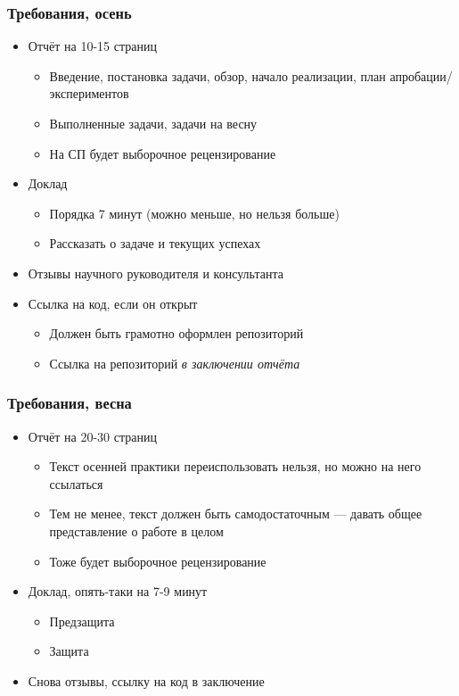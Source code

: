 \documentclass{../../slides-style}
\begin{document}
    \begin{frame}
        \frametitle{Требования, осень}
        \begin{itemize}
            \item Отчёт на 10-15 страниц
            \begin{itemize}
                \item Введение, постановка задачи, обзор, начало реализации, план апробации/экспериментов
                \item Выполненные задачи, задачи на весну
                \item На СП будет выборочное рецензирование
            \end{itemize}
            \item Доклад
            \begin{itemize}
                \item Порядка 7 минут (можно меньше, но нельзя больше)
                \item Рассказать о задаче и текущих успехах
            \end{itemize}
            \item Отзывы научного руководителя и консультанта
            \item Ссылка на код, если он открыт
            \begin{itemize}
                \item Должен быть грамотно оформлен репозиторий
                \item Ссылка на репозиторий \emph{в заключении отчёта}
            \end{itemize}
        \end{itemize}
    \end{frame}

    \begin{frame}
        \frametitle{Требования, весна}
        \begin{itemize}
            \item Отчёт на 20-30 страниц
            \begin{itemize}
                \item Текст осенней практики переиспользовать нельзя, но можно на него ссылаться
                \item Тем не менее, текст должен быть самодостаточным --- давать общее представление о работе в целом
                \item Тоже будет выборочное рецензирование
            \end{itemize}
            \item Доклад, опять-таки на 7-9 минут
            \begin{itemize}
                \item Предзащита
                \item Защита
            \end{itemize}
            \item Снова отзывы, ссылку на код в заключение
        \end{itemize}
    \end{frame}
\end{document}
